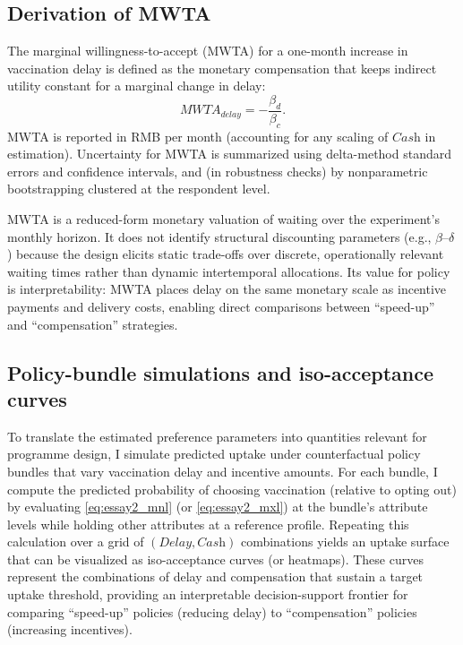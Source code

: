\documentclass[doublespacing]{utdthesis}
\begin{document}
\subsection{Derivation of MWTA}
The marginal willingness-to-accept (MWTA) for a one-month increase in vaccination delay is defined as the monetary compensation that keeps indirect utility constant for a marginal change in delay:
\begin{equation}
MWTA_{\textit{delay}} = -\frac{\beta_{d}}{\beta_{c}}.
\label{eq:essay2_mwta}
\end{equation}
MWTA is reported in RMB per month (accounting for any scaling of $\textit{Cash}$ in estimation). Uncertainty for MWTA is summarized using delta-method standard errors and confidence intervals, and (in robustness checks) by nonparametric bootstrapping clustered at the respondent level.

MWTA is a reduced-form monetary valuation of waiting over the experiment’s monthly horizon. It does not identify structural discounting parameters (e.g., $\beta$--$\delta$) because the design elicits static trade-offs over discrete, operationally relevant waiting times rather than dynamic intertemporal allocations. Its value for policy is interpretability: MWTA places delay on the same monetary scale as incentive payments and delivery costs, enabling direct comparisons between ``speed-up'' and ``compensation'' strategies.

\subsection{Policy-bundle simulations and iso-acceptance curves}
To translate the estimated preference parameters into quantities relevant for programme design, I simulate predicted uptake under counterfactual policy bundles that vary vaccination delay and incentive amounts. For each bundle, I compute the predicted probability of choosing vaccination (relative to opting out) by evaluating \eqref{eq:essay2_mnl} (or \eqref{eq:essay2_mxl}) at the bundle’s attribute levels while holding other attributes at a reference profile. Repeating this calculation over a grid of $(\textit{Delay}, \textit{Cash})$ combinations yields an uptake surface that can be visualized as iso-acceptance curves (or heatmaps). These curves represent the combinations of delay and compensation that sustain a target uptake threshold, providing an interpretable decision-support frontier for comparing ``speed-up'' policies (reducing delay) to ``compensation'' policies (increasing incentives).
\end{document}
